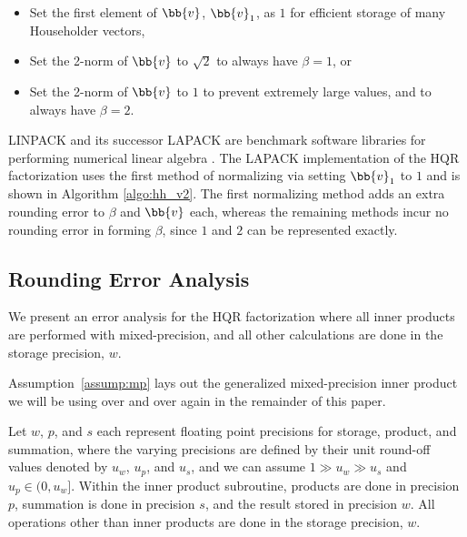 \begin{itemize}
	\item Set the first element of $\bb{v}$,  $\bb{v}_1$, as $1$ for efficient storage of many Householder vectors,
	\item Set the 2-norm of $\bb{v}$ to $\sqrt{2}$ to always have $\beta=1$, or
	\item Set the 2-norm of $\bb{v}$ to $1$ to prevent extremely large values, and to always have $\beta=2$.
\end{itemize}
LINPACK and its successor LAPACK are benchmark software libraries for performing numerical linear algebra \cite{LAPACK}. 
The LAPACK implementation of the HQR factorization uses  the first method of normalizing via setting $\bb{v}_1$ to $1$ and is shown in Algorithm \ref{algo:hh_v2}. %
The first normalizing method adds an extra rounding error to $\beta$ and $\bb{v}$ each, whereas the remaining methods incur no rounding error in forming $\beta$, since $1$ and $2$ can be represented exactly.




\subsection{Rounding Error Analysis}
\label{sec:HQRre}
We present an error analysis for the HQR factorization where all inner products are performed with mixed-precision, and all other calculations are done in the storage precision, $w$.

Assumption~\ref{assump:mp} lays out the generalized mixed-precision inner product we will be using over and over again in the remainder of this paper.

\begin{assump}
	\label{assump:mp}
	Let $w$, $p$, and $s$ each represent floating point precisions for storage, product, and summation, where the varying precisions are defined by their unit round-off values denoted by $u_w$, $u_p$, and $u_s$, and we can assume $1\gg u_w \gg u_s$ and $u_p\in (0, u_w]$. 
	Within the inner product subroutine, products are done in precision $p$, summation is done in precision $s$, and the result stored in precision $w$.
	All operations other than inner products are done in the storage precision, $w$.
\end{assump}

